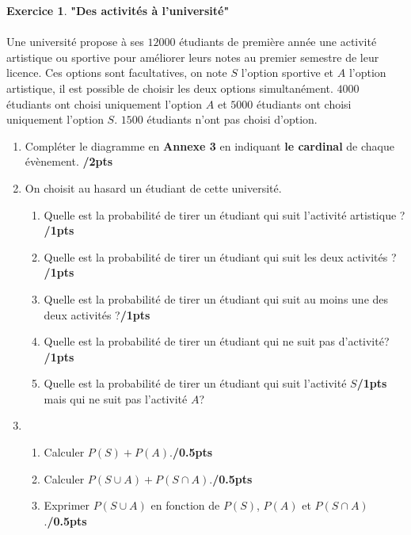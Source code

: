 \documentclass[a4paper,11pt]{article}
\theoremstyle{definition}
\newtheorem{exo}{Exercice}
\begin{document}
\begin{exo}\textbf{"Des activités à l'université"}\\\hfil\\
	Une université propose à ses $12000$ étudiants de première année une activité artistique ou sportive pour améliorer leurs notes au premier semestre de leur licence. Ces options sont facultatives, on note $S$ l'option sportive et $A$ l'option artistique, il est possible de choisir les deux options simultanément.
	$4000$ étudiants ont choisi uniquement l'option $A$ et $5000$ étudiants ont choisi uniquement l'option $S$. $1500$ étudiants n'ont pas choisi d'option.\\ 
	\begin{enumerate}
		\item Compléter le diagramme en \textbf{Annexe 3} en indiquant \textbf{le cardinal} de chaque évènement. \hfill\textbf{/2pts}

		\item On choisit au hasard un étudiant de cette université.
		\begin{enumerate}
			\item Quelle est la probabilité de tirer un étudiant qui suit l'activité artistique ? \hfill\textbf{/1pts}\\[0.25cm]
			\item Quelle est la probabilité de tirer un étudiant qui suit les deux activités ? \hfill\textbf{/1pts}\\[0.25cm]
			\item Quelle est la probabilité de tirer un étudiant qui suit au moins une des deux activités ?\hfill\textbf{/1pts}\\[0.25cm]
			\item Quelle est la probabilité de tirer un étudiant qui ne suit pas d'activité? \hfill\textbf{/1pts}\\[0.25cm]
			\item Quelle est la probabilité de tirer un étudiant qui suit l'activité $S$\hfill\textbf{/1pts}\\ mais qui ne suit pas l'activité $A$? \\[0.25cm]

		\end{enumerate}
		\item \begin{enumerate}
			\item Calculer $P(S) + P(A) $.\hfill\textbf{/0.5pts}\\[0.25cm]
			\item Calculer $P(S\cup A) + P(S\cap A) $.\hfill\textbf{/0.5pts}\\[0.25cm]
			\item Exprimer $P(S\cup A)$ en fonction de $P(S)$, $P(A) $ et $P(S\cap A)$.\hfill\textbf{/0.5pts}
		\end{enumerate} 
		
	\end{enumerate} 
\end{exo}
\end{document}
